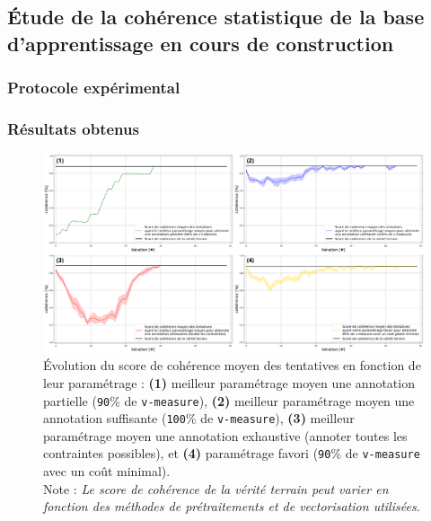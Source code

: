 	\subsection{Étude de la cohérence statistique de la base d'apprentissage en cours de construction}
	
		\subsubsection{Protocole expérimental}

		\subsubsection{Résultats obtenus}
			\begin{figure}[!htb]
				\centering
				\includegraphics[width=\textwidth]{figures/etude-pertinence-consistence}
				\caption{Évolution du score de cohérence moyen des tentatives en fonction de leur paramétrage : \textbf{(1)} meilleur paramétrage moyen une annotation partielle (\texttt{90}\% de \texttt{v-measure}), \textbf{(2)} meilleur paramétrage moyen une annotation suffisante (\texttt{100}\% de \texttt{v-measure}), \textbf{(3)} meilleur paramétrage moyen une annotation exhaustive (annoter toutes les contraintes possibles), et \textbf{(4)} paramétrage favori (\texttt{90}\% de \texttt{v-measure} avec un coût minimal). \\
				Note : \textit{Le score de cohérence de la vérité terrain peut varier en fonction des méthodes de prétraitements et de vectorisation utilisées.}}
				\label{figure:4.3.1-ETUDE-PERTINENCE-CONHERENCE-ANNOTATION}
			\end{figure}

